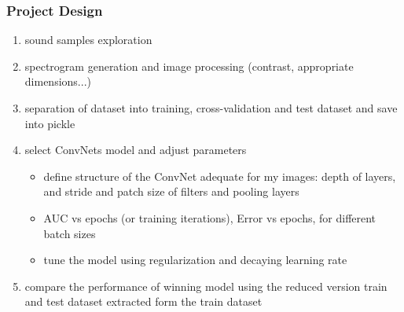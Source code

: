 \documentclass[]{article}
\begin{document}
\subsubsection{Project Design}\label{project-design}

\begin{enumerate}
	\item sound samples exploration
	\item spectrogram generation and image processing (contrast, appropriate dimensions...)
	\item separation of dataset into training, cross-validation and test dataset and save into pickle 
	\item select ConvNets model and adjust parameters
	\begin{itemize}
		\item define structure of the ConvNet adequate for my images: depth of layers, and stride and patch size of filters and pooling layers
		\item AUC vs epochs (or training iterations), Error vs epochs, for different batch sizes
		\item tune the model using regularization and decaying learning rate		
	\end{itemize}
	\item compare the performance of winning model using the reduced version train and test dataset extracted form the train dataset
\end{enumerate}
\end{document}
